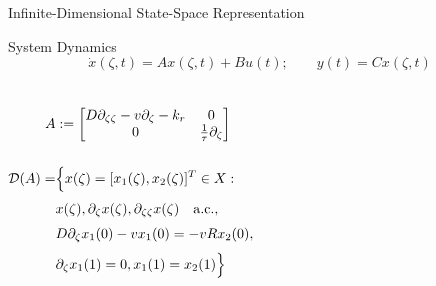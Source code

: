 \documentclass[8pt]{beamer}
\begin{document}
\begin{frame}{Infinite-Dimensional State-Space Representation}
    
\begin{block}{System Dynamics}
    \begin{equation} \label{eq:state_space}
        \dot{x}(\zeta, t) = A x(\zeta, t) + B u(t); \qquad
        y(t) = C x(\zeta, t)
    \end{equation}
\end{block}
    
\begin{columns}[c]

\begin{equation} \label{eq:operator_A}
    \begin{aligned}
        A &:=
        \begin{bmatrix}
            D \partial_{\zeta \zeta} - v \partial_\zeta - k_r & 0 \\
            0 & \frac{1}{\tau} \partial_\zeta
        \end{bmatrix} \\[5mm]
        \mathcal{D}(A) =& \Bigl\{ x(\zeta) = [x_1(\zeta), x_2(\zeta)]^T \in X:\\[1mm]
        &x(\zeta), \partial_\zeta x(\zeta), \partial_{\zeta \zeta} x(\zeta) \quad \mathrm{a.c.},\\[1mm]
        &D \partial_\zeta x_1(0) - v x_1(0) = -v R x_2(0),\\[1mm]
        &\partial_\zeta x_1(1) = 0,
        x_1(1) = x_2(1) \Bigr\}\\
    \end{aligned}
\end{equation}




\end{columns}
\end{frame}
\end{document}
